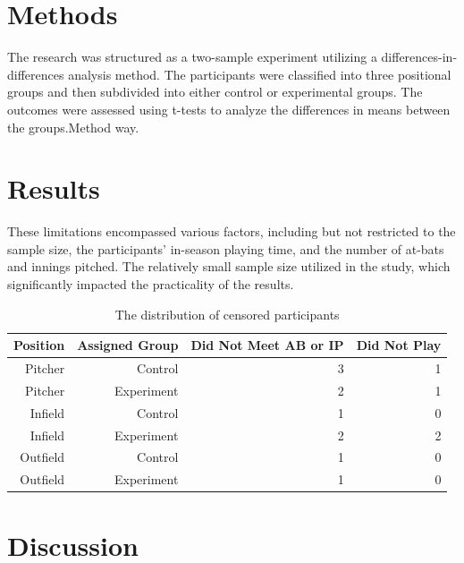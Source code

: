 \documentclass[12pt]{article}
\begin{document}
\section{Methods}
\label{sec:meth}
The research was structured as a two-sample experiment utilizing a differences-in-differences analysis method.
The participants were classified into three positional groups and then subdivided into either control or experimental groups. 
The outcomes were assessed using t-tests to analyze the differences in means between the groups.Method way\cite*{Dalmass2018baseball}.




\section{Results}
\label{sec:resu}
These limitations encompassed various factors, including but not restricted to the sample size, the participants' in-season playing time,
and the number of at-bats and innings pitched. The relatively small sample size utilized in the study, which significantly impacted the practicality of the results.

\begin{table}[tbp]
  \caption{The distribution of censored participants}
  \label{tab:rv}
\centering
\begin{tabular}{rrrr}
  \toprule
  Position & Assigned Group & Did Not Meet AB or IP & Did Not Play\\ 
  \midrule
Pitcher & Control & 3 & 1\\
Pitcher & Experiment & 2 & 1\\
Infield & Control & 1 & 0 \\
Infield & Experiment & 2 & 2\\
Outfield & Control & 1 & 0\\
Outfield & Experiment & 1 & 0\\
  \bottomrule
\end{tabular}
\end{table}

\section{Discussion}
\label{sec:disc}




\begin{thebibliography}{9}

  
  
\end{thebibliography}
\end{document}
